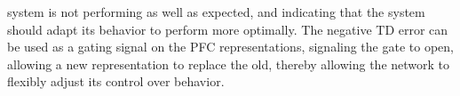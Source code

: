 system is not performing as well as expected, and indicating that the system should adapt its behavior to perform more optimally.  The negative TD error can be used as a gating signal on the PFC representations, signaling the gate to open, allowing a new representation to replace the old, thereby allowing the network to flexibly adjust its control over behavior.

